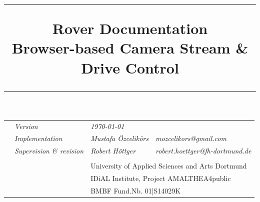 


\title{\rule{\textwidth}{1pt}\textbf{ Rover Documentation} \\ Browser-based Camera Stream \& Drive Control \rule{\textwidth}{1pt}\vspace{-20pt}}
\date{}
\maketitle 
\setlength{\headsep}{20pt}
\vspace{-20pt}
\begin{tabularx}{\textwidth}{Xlll}
	& \textit{Version} & \textit{\today }&\\
	&\textit{Implementation} &\textit{Mustafa Özcelikörs} & \textit{mozcelikors@gmail.com}\\
	&\textit{Supervision \& revision} &\textit{Robert Höttger} &\textit{robert.hoettger@fh-dortmund.de}\\ \\
	&&\multicolumn{2}{l}{University of Applied Sciences and Arts Dortmund}\\ 
	&&\multicolumn{2}{l}{IDiAL Institute, Project AMALTHEA4public}\\
	&&\multicolumn{2}{l}{BMBF  	Fund.Nb. 01|S14029K} 
\end{tabularx} 
\vspace{15pt}\\
